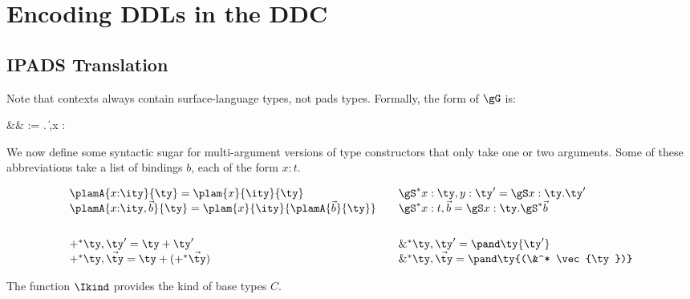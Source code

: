 \section{Encoding DDLs in the DDC}

\subsection{IPADS Translation}
\label{sec:trans-sl}

Note that contexts always contain surface-language types, not pads
types. Formally, the form of $\gG$ is:
\begin{bnf}
\name{}  &\gG & \::= . \| \gG,x {:} \ity
\end{bnf}

We now define some syntactic sugar for multi-argument versions of type
constructors that only take one or two arguments. Some of these
abbreviations take a list of bindings $b$, each of the form $x{:}t$.

\begin{align*}
  &\begin{array}{l}
    \plamA{x{:}\ity}{\ty} = \plam{x}{\ity}{\ty} \\
    \plamA{x{:}\ity,\vec{b}}{\ty} = \plam{x}{\ity}{\plamA{\vec{b}}{\ty}}
  \end{array}
  &
  &\begin{array}{l}
    \gS^* x:\ty,y:\ty' = \gS x:\ty.\ty' \\
    \gS^* x:t,\vec b   = \gS x:\ty.\gS^* \vec b
  \end{array}
  \\ \\
  &\begin{array}{l}
    +^* \ty,\ty' = \ty + \ty'\\
    +^* \ty,\vec{\ty} = \ty + (+^* \vec{\ty})
  \end{array}
  &
  &\begin{array}{l}
    \&^* \ty,\ty' =\pand \ty {\ty'}\\
    \&^* \ty,\vec{\ty} = \pand \ty {(\&^* \vec{\ty})}
  \end{array}
\end{align*}

The function $\Ikind$ provides the kind of base types $C$.


